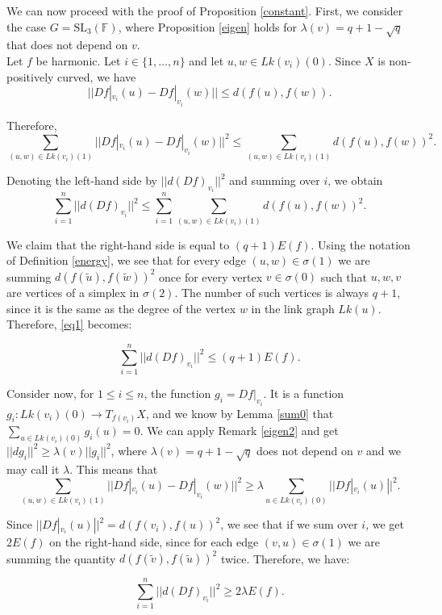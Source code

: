 \documentclass{article}
\theoremstyle{definition}
\theoremstyle{remark}
\theoremstyle{plain}
\begin{document}
We can now proceed with the proof of Proposition \ref{constant}. First, we consider the case $G=\mathrm{SL}_3(\mathbb{F})$, where Proposition \ref{eigen} holds for $\lambda(v)=q+1-\sqrt{q}$ that does not depend on $v$. \\

Let $f$ be harmonic. Let $i\in\{1,\ldots,n\}$ and let $u,w\in Lk(v_i)(0)$. Since $X$ is non-positively curved, we have $$||Df|_{v_i}(u)-Df|_{v_i}(w)||\leq d(f(u),f(w)).$$

Therefore, $$\sum_{(u,w)\in Lk(v_i)(1)}{||Df|_{v_i}(u)-Df|_{v_i}(w)||^2}\leq\sum_{(u,w)\in Lk(v_i)(1)}{d(f(u),f(w))^2}.$$

Denoting the left-hand side by $||d(Df)_{v_i}||^2$ and summing over $i$, we obtain
\begin{equation} \label{eq1}
    \sum_{i=1}^{n}{||d(Df)_{v_i}||^2}\leq\sum_{i=1}^{n}{\sum_{(u,w)\in Lk(v_i)(1)}{d(f(u),f(w))^2}}.
\end{equation}

We claim that the right-hand side is equal to $(q+1)E(f)$. Using the notation of Definition \ref{energy}, we see that for every edge $(u,w)\in\sigma(1)$ we are summing $d(f(\widetilde{u}),f(\widetilde{w}))^2$ once for every vertex $v\in\sigma(0)$ such that $u,w,v$ are vertices of a simplex in $\sigma(2)$. The number of such vertices is always $q+1$, since it is the same as the degree of the vertex $w$ in the link graph $Lk(u)$. Therefore, \eqref{eq1} becomes:

\begin{equation} \label{eq2}
    \sum_{i=1}^{n}{||d(Df)_{v_i}||^2}\leq (q+1)E(f).
\end{equation}

Consider now, for $1\leq i\leq n$, the function $g_i=Df|_{v_i}$. It is a function $g_i: Lk(v_i)(0)\rightarrow T_{f(v_i)}X$, and we know by Lemma \ref{sum0} that $\sum_{u\in Lk(v_i)(0)}{g_i(u)}=0$. We can apply Remark \ref{eigen2} and get $||dg_i||^2\geq\lambda(v)||g_i||^2$, where $\lambda(v)=q+1-\sqrt{q}$ does not depend on $v$ and we may call it $\lambda$. This means that $$\sum_{(u,w)\in Lk(v_i)(1)}{||Df|_{v_i}(u)-Df|_{v_i}(w)||^2}\geq\lambda\sum_{u\in Lk(v_i)(0)}{||Df|_{v_i}(u)||^2}.$$

Since $||Df|_{v_i}(u)||^2=d(f(v_i),f(u))^2$, we see that if we sum over $i$, we get $2E(f)$ on the right-hand side, since for each edge $(v,u)\in\sigma(1)$ we are summing the quantity $d(f(\widetilde{v}),f(\widetilde{u}))^2$ twice. Therefore, we have:

\begin{equation} \label{eq3}
    \sum_{i=1}^{n}{||d(Df)_{v_i}||^2}\geq 2\lambda E(f).
\end{equation}
\end{document}
